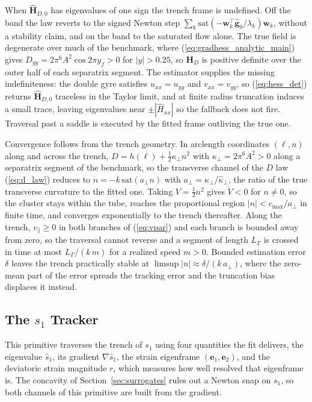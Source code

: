 \documentclass[lettersize,journal]{IEEEtran}
\begin{document}
When $\hat{\mathbf{H}}_{D,0}$ has eigenvalues of one sign the trench
frame is undefined. Off the band the law reverts to the signed Newton
step $\sum_k \mathrm{sat}(-\mathbf{w}_k^\top\hat{\mathbf{g}}_0/
\lambda_k)\mathbf{w}_k$, without a stability claim, and on the band to
the saturated flow alone. The true field is degenerate over much of the
benchmark, where (\ref{eq:gradhess_analytic_main}) gives $D_{yy} = 2\pi^6
A^2\cos 2\pi y_f > 0$ for $|y| > 0.25$, so $\mathbf{H}_D$ is positive
definite over the outer half of each separatrix segment. The estimator
supplies the missing indefiniteness: the double gyre satisfies $u_{xx} =
u_{yy}$ and $v_{xx} = v_{yy}$, so (\ref{eq:hess_det}) returns
$\hat{\mathbf{H}}_{D,0}$ traceless in the Taylor limit, and at finite
radius truncation induces a small trace, leaving eigenvalues near
$\pm|\hat{H}_{xx}|$ so the fallback does not fire. Traversal past a
saddle is executed by the fitted frame outliving the true one.

Convergence follows from the trench geometry. In arclength coordinates
$(\ell, n)$ along and across the trench, $D = h(\ell) +
\tfrac{1}{2}\kappa_\perp n^2$ with $\kappa_\perp = 2\pi^6 A^2 > 0$ along
a separatrix segment of the benchmark, so the transverse channel of the
$D$ law (\ref{eq:d_law}) reduces to $\dot{n} = -k\,\mathrm{sat}(a_\perp
n)$ with
$a_\perp = \kappa_\perp/\hat{\kappa}_\perp$, the ratio of the true
transverse curvature to the fitted one. Taking $V = \tfrac{1}{2}n^2$
gives $\dot{V} < 0$ for $n \neq 0$, so the cluster stays within the tube,
reaches the proportional region $|n| < c_{\max}/a_\perp$ in finite time,
and converges exponentially to the trench thereafter. Along the trench,
$v_\parallel \geq 0$ in both branches of (\ref{eq:vpar}) and each branch
is bounded away from zero, so the traversal cannot reverse and a segment
of length $L_\Gamma$ is crossed in time at most $L_\Gamma/(k\,m)$ for a
realized speed $m > 0$. Bounded estimation error $\delta$ leaves the
trench practically stable at $\limsup |n| \approx \delta/(k\,a_\perp)$,
where the zero-mean part of the error spreads the tracking error and the
truncation bias displaces it instead.

\subsection{The $s_1$ Tracker}

This primitive traverses the trench of $s_1$ using four quantities the
fit delivers, the eigenvalue $\hat{s}_1$, its gradient
$\nabla\hat{s}_1$, the strain eigenframe $(\mathbf{e}_1, \mathbf{e}_2)$,
and the deviatoric strain magnitude $r$, which measures how well resolved
that eigenframe is. The concavity of Section~\ref{sec:surrogates} rules
out a Newton snap on $s_1$, so both
channels of this primitive are built from the gradient.
\end{document}
